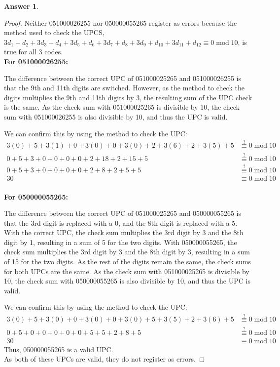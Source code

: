 \documentclass[article, 12pt]{article}
\theoremstyle{definition}
\newtheorem{answer}{Answer}
\newcommand{\Mod}[1]{\;\mathrm{mod}\; #1} %
\begin{document}
    \begin{answer}
        \begin{proof}
            Neither 051000026255 nor 050000055265 register as errors because the method used to check the UPCS, $3d_1 + d_2 + 3d_3 + d_4 + 3d_5 + d_6 + 3d_7 + d_8 + 3d_9 + d_{10} + 3d_{11} + d_{12} \equiv 0 \Mod{10}$, is true for all 3 codes.
            \\[12pt]
            \textbf{For 051000026255:} 

                The difference between the correct UPC of 051000025265 and 051000026255 is that the 9th and 11th digits are switched. However, as the method to check the digits multiplies the 9th and 11th digits by 3, the resulting sum of the UPC check is the same. As the check sum with 051000025265 is divisible by 10, the check sum with 051000026255 is also divisible by 10, and thus the UPC is valid.

                We can confirm this by using the method to check the UPC:
            \begin{align*}
                3(0) + 5 + 3(1) + 0 + 3(0) + 0 + 3(0) + 2 + 3(6) + 2 + 3(5) + 5 &\stackrel{?}{\equiv} 0 \Mod{10} \\
                0 + 5 + 3 + 0 + 0 + 0 + 0 + 2 + 18 + 2 + 15 + 5 &\stackrel{?}{\equiv} 0 \Mod{10} \\
                0 + 5 + 3 + 0 + 0 + 0 + 0 + 2 + 8 + 2 + 5 + 5 &\stackrel{?}{\equiv} 0 \Mod{10} \\
                30 &\equiv 0 \Mod{10}
            \end{align*}
            \\[12pt]
            \textbf{For 050000055265:}

                The difference between the correct UPC of 051000025265 and 050000055265 is that the 3rd digit is replaced with a 0, and the 8th digit is replaced with a 5. With the correct UPC, the check sum multiplies the 3rd digit by 3 and the 8th digit by 1, resulting in a sum of 5 for the two digits. With 050000055265, the check sum multiplies the 3rd digit by 3 and the 8th digit by 3, resulting in a sum of 15 for the two digits. As the rest of the digits remain the same, the check sums for both UPCs are the same. As the check sum with 051000025265 is divisible by 10, the check sum with 050000055265 is also divisible by 10, and thus the UPC is valid.

                We can confirm this by using the method to check the UPC:
            \begin{align*}
                3(0) + 5 + 3(0) + 0 + 3(0) + 0 + 3(0) + 5 + 3(5) + 2 + 3(6) + 5 &\stackrel{?}{\equiv} 0 \Mod{10} \\
                0 + 5 + 0 + 0 + 0 + 0 + 0 + 5 + 5 + 2 + 8 + 5 &\stackrel{?}{\equiv} 0 \Mod{10} \\
                30 &\equiv 0 \Mod{10}
            \end{align*}
            Thus, 050000055265 is a valid UPC. 
            \\[12pt]
            As both of these UPCs are valid, they do not register as errors.
        \end{proof}
    \end{answer}
\end{document}
